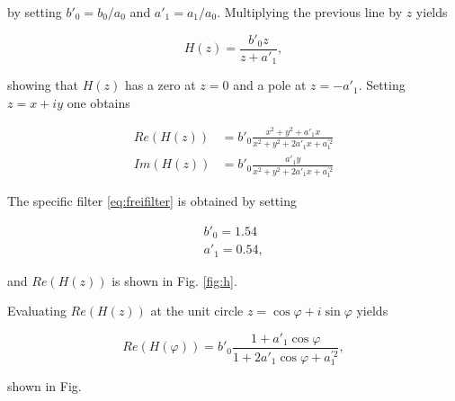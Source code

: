 \documentclass[12pt,a4paper]{article}
\begin{document}
by setting $b'_0=b_0/a_0$ and $a'_1=a_1/a_0$. Multiplying the previous line by $z$ yields

\begin{equation}\label{eq:iirf_trafofct_normal2}
H(z)=\frac{b'_0z}{z+a'_1},
\end{equation}

showing that $H(z)$ has a zero at $z=0$ and a pole at $z=-a'_1$. Setting $z=x+iy$ one obtains

\begin{align}
Re(H(z)) &= b'_0\frac{x^2+y^2+a'_1x}{x^2+y^2+2a'_1x+a_1^{'2}}\\
Im(H(z)) &= b'_0\frac{a'_1y}{x^2+y^2+2a'_1x+a_1^{'2}}
\end{align}

The specific filter \eqref{eq:freifilter} is obtained by setting

\begin{align}
b'_0=1.54 \\
a'_1=0.54,
\end{align}

and $Re(H(z))$ is shown in Fig. \ref{fig:h}.


Evaluating $Re(H(z))$ at the unit circle $z=\cos{\varphi}+i \sin{\varphi}$ yields

\begin{equation}
Re(H(\varphi))=b'_0\frac{1+a'_1\cos{\varphi}}{1+2a'_1\cos{\varphi}+a_1^{'2}},
\end{equation}

shown in Fig.








\end{document}
